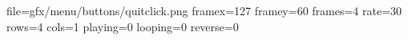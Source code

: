 file=gfx/menu/buttons/quitclick.png
framex=127
framey=60
frames=4
rate=30
rows=4
cols=1
playing=0
looping=0
reverse=0